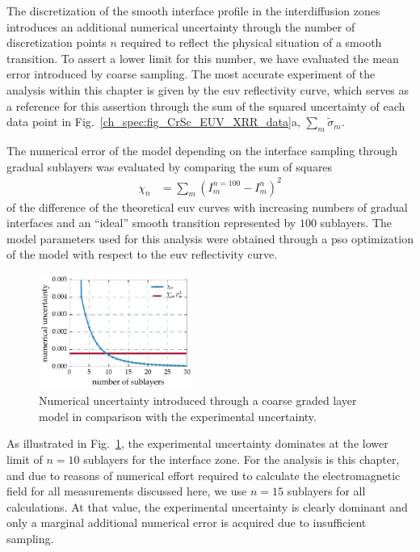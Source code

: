 The discretization of the smooth interface profile in the interdiffusion zones introduces an additional numerical uncertainty through the number of discretization points $n$ required to reflect the physical situation of a smooth transition. To assert a lower limit for this number, we have evaluated the mean error introduced by coarse sampling. The most accurate experiment of the analysis within this chapter is given by the \gls{euv} reflectivity curve, which serves as a reference for this assertion through the sum of the squared uncertainty of each data point in Fig.~\ref{ch_spec:fig_CrSc_EUV_XRR_data}a, $\sum_m \tilde{\sigma}_m$. 

The numerical error of the model depending on the interface sampling through gradual sublayers was evaluated by comparing the sum of squares
\begin{align}
\chi_n &= \sum\limits_m (I^{n=100}_m - I^n_m)^2
\end{align}
of the difference of the theoretical \gls{euv} curves with increasing numbers of gradual interfaces and an ``ideal'' smooth transition represented by $100$ sublayers. The model parameters used for this analysis were obtained through a \gls{pso} optimization of the model with respect to the \gls{euv} reflectivity curve.
\begin{figure}[htbp]
  \centering
  \includegraphics[width=0.45\textwidth]{img/CrSc_numerical_uncertainty_mixlayer}
  \caption{Numerical uncertainty introduced through a coarse graded layer model in comparison with the experimental uncertainty.}
  \label{ch_spec:fig_CrSc_numerical_uncertainty_mixlayer}
\end{figure}
As illustrated in Fig.~\ref{ch_spec:fig_CrSc_numerical_uncertainty_mixlayer}, the experimental uncertainty dominates at the lower limit of $n=10$ sublayers for the interface zone.
For the analysis is this chapter, and due to reasons of numerical effort required to calculate the electromagnetic field for all measurements discussed here, we use $n=15$ sublayers for all calculations. At that value, the experimental uncertainty is clearly dominant and only a marginal additional numerical error is acquired due to insufficient sampling.


